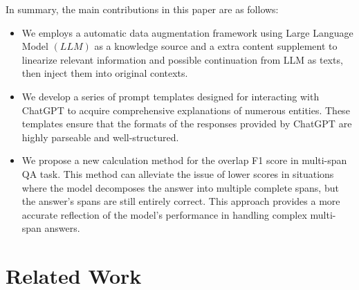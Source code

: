 \documentclass[a4paper,fleqn]{cas-dc}
\newcommand{\1}[1]{\mathds{1}\left[#1\right]}
\begin{document}
In summary, the main contributions in this paper are as follows:
\begin{itemize}
	\item We employs a automatic data augmentation framework using Large Language Model \((LLM)\) as a knowledge source and a extra content supplement to linearize relevant information and possible continuation from LLM as texts, then inject them into original contexts. 

	\item We develop a series of prompt templates designed for interacting with ChatGPT to acquire comprehensive explanations of numerous entities. These templates ensure that the formats of the responses provided by ChatGPT are highly parseable and well-structured.
	
	\item We propose a new calculation method for the overlap F1 score in multi-span QA task. This method can alleviate the issue of lower scores in situations where the model decomposes the answer into multiple complete spans, but the answer’s spans are still entirely correct. This approach provides a more accurate reflection of the model’s performance in handling complex multi-span answers.
\end{itemize}

\section{Related Work}
\label{sec:related}
\end{document}
